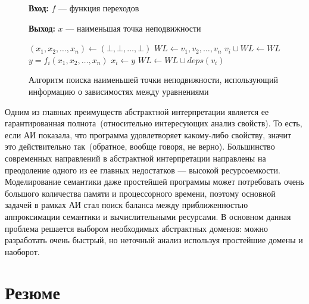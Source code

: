 \begin{figure}[h!]
\textbf{Вход:} $f$ --- функция переходов

\textbf{Выход:} $x$ --- наименьшая точка неподвижности

\begin{algorithmic}
\State $(x_1, x_2, \ldots, x_n) \gets (\bot, \bot, \ldots, \bot)$ 
\State $WL \gets {v_1, v_2, \ldots, v_n}$ 
	\State ${v_i} \cup WL \gets WL$
	\State $y = f_i(x_1, x_2, \ldots, x_n)$ 
		\State $x_i \gets y$
		\State $WL \gets WL \cup deps(v_i)$
	\EndIf 
\EndWhile
\end{algorithmic}

\caption{Алгоритм поиска наименьшей точки неподвижности, использующий 
информацию о зависимостях между уравнениями}
\label{image:worklistLFP}
\end{figure}

Одним из главных преимуществ абстрактной интерпретации является ее 
гарантированная полнота~(относительно интересующих анализ свойств). То есть,
если АИ показала, что программа удовлетворяет какому-либо свойству, значит это
действительно так~(обратное, вообще говоря, не верно). Большинство современных
направлений в абстрактной интерпретации направлены на преодоление одного из ее
главных недостатков --- высокой ресурсоемкости. Моделирование семантики даже простейшей программы может потребовать очень большого количества памяти и 
процессорного времени, поэтому основной задачей в рамках АИ стал поиск баланса 
между приближенностью аппроксимации семантики и вычислительными ресурсами.
В основном данная проблема решается выбором необходимых абстрактных доменов:
можно разработать очень быстрый, но неточный анализ используя простейшие домены
и наоборот. 

\section{Резюме}

